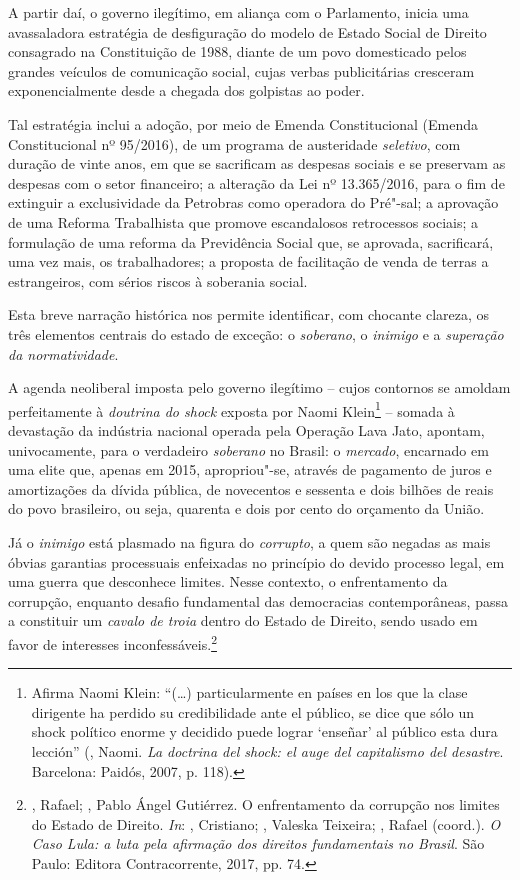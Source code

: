 A partir daí, o governo ilegítimo, em aliança com o Parlamento, inicia
uma avassaladora estratégia de desfiguração do modelo de Estado Social
de Direito consagrado na Constituição de 1988, diante de um povo
domesticado pelos grandes veículos de comunicação social, cujas verbas
publicitárias cresceram exponencialmente desde a chegada dos golpistas
ao poder.

Tal estratégia inclui a adoção, por meio de Emenda Constitucional
(Emenda Constitucional nº 95/2016), de um programa de austeridade
\emph{seletivo}, com duração de vinte anos, em que se sacrificam as
despesas sociais e se preservam as despesas com o setor financeiro; a
alteração da Lei nº 13.365/2016, para o fim de extinguir a exclusividade
da Petrobras como operadora do Pré"-sal; a aprovação de uma Reforma
Trabalhista que promove escandalosos retrocessos sociais; a formulação
de uma reforma da Previdência Social que, se aprovada, sacrificará, uma
vez mais, os trabalhadores; a proposta de facilitação de venda de terras
a estrangeiros, com sérios riscos à soberania social.

Esta breve narração histórica nos permite identificar, com chocante
clareza, os três elementos centrais do estado de exceção: o
\emph{soberano}, o \emph{inimigo} e a \emph{superação da normatividade}.

A agenda neoliberal imposta pelo governo ilegítimo -- cujos contornos se
amoldam perfeitamente à \emph{doutrina do shock} exposta por Naomi
Klein\footnote{Afirma Naomi Klein: ``(\ldots{}) particularmente en países en
  los que la clase dirigente ha perdido su credibilidade ante el
  público, se dice que sólo un shock político enorme y decidido puede
  lograr `enseñar' al público esta dura lección'' (, Naomi.
  \emph{La doctrina del shock: el auge del capitalismo del desastre}.
  Barcelona: Paidós, 2007, p. 118).} -- somada à devastação da indústria
nacional operada pela Operação Lava Jato, apontam, univocamente, para o
verdadeiro \emph{soberano} no Brasil: o \emph{mercado}, encarnado em uma
elite que, apenas em 2015, apropriou"-se, através de pagamento de juros e
amortizações da dívida pública, de novecentos e sessenta e dois bilhões
de reais do povo brasileiro, ou seja, quarenta e dois por cento do
orçamento da União.

Já o \emph{inimigo} está plasmado na figura do \emph{corrupto}, a quem
são negadas as mais óbvias garantias processuais enfeixadas no princípio
do devido processo legal, em uma guerra que desconhece limites. Nesse
contexto, o enfrentamento da corrupção, enquanto desafio fundamental das
democracias contemporâneas, passa a constituir um \emph{cavalo de troia}
dentro do Estado de Direito, sendo usado em favor de interesses
inconfessáveis.\footnote{, Rafael; , Pablo Ángel
  Gutiérrez. O enfrentamento da corrupção nos limites do Estado de
  Direito. \emph{In}:  , Cristiano;  , Valeska
  Teixeira; , Rafael (coord.). \emph{O Caso Lula: a luta pela
  afirmação dos direitos fundamentais no Brasil}. São Paulo: Editora
  Contracorrente, 2017, pp. 74.}

